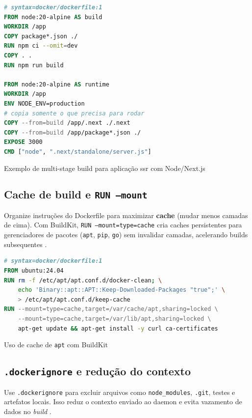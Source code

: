\begin{codigo}[H]
\begin{lstlisting}[language=Dockerfile]
# syntax=docker/dockerfile:1
FROM node:20-alpine AS build
WORKDIR /app
COPY package*.json ./
RUN npm ci --omit=dev
COPY . .
RUN npm run build

FROM node:20-alpine AS runtime
WORKDIR /app
ENV NODE_ENV=production
# copia somente o que precisa para rodar
COPY --from=build /app/.next ./.next
COPY --from=build /app/package*.json ./
EXPOSE 3000
CMD ["node", ".next/standalone/server.js"]
\end{lstlisting}
\caption{Exemplo de multi-stage build para aplicação \acrshort{ssr} com Node/Next.js}
\label{lst:dockerfile-multistage}
\end{codigo}

\subsection{Cache de build e \texttt{RUN --mount}}
\label{subsec:cache-build}

Organize instruções do Dockerfile para maximizar \textbf{cache} (mudar menos camadas de cima). Com BuildKit, \texttt{RUN --mount=type=cache} cria caches persistentes para gerenciadores de pacotes (\texttt{apt}, \texttt{pip}, \texttt{go}) sem invalidar camadas, acelerando builds subsequentes \cite{dockerfile_ref}. 

\begin{codigo}[H]
\begin{lstlisting}[language=Dockerfile]
# syntax=docker/dockerfile:1
FROM ubuntu:24.04
RUN rm -f /etc/apt/apt.conf.d/docker-clean; \
    echo 'Binary::apt::APT::Keep-Downloaded-Packages "true";' \
    > /etc/apt/apt.conf.d/keep-cache
RUN --mount=type=cache,target=/var/cache/apt,sharing=locked \
    --mount=type=cache,target=/var/lib/apt,sharing=locked \
    apt-get update && apt-get install -y curl ca-certificates
\end{lstlisting}
\caption{Uso de cache de \texttt{apt} com BuildKit}
\label{lst:dockerfile-cache}
\end{codigo}

\subsection{\texttt{.dockerignore} e redução do contexto}
\label{subsec:dockerignore}

Use \texttt{.dockerignore} para excluir arquivos como \texttt{node\_modules}, \texttt{.git}, testes e artefatos locais. Isso reduz o contexto enviado ao daemon e evita vazamento de dados no \textit{build} \cite{dockerfile_ref}. 

